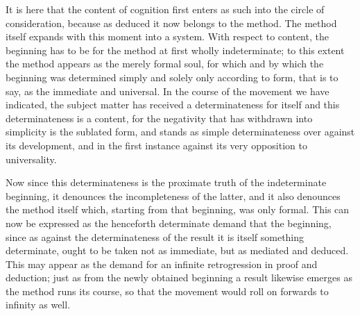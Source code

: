 It is here that the content of cognition first enters
as such into the circle of consideration,
because as deduced it now belongs to the method.
The method itself expands with this moment into a system.
With respect to content, the beginning has to be
for the method at first wholly indeterminate;
to this extent the method appears as the merely formal soul,
for which and by which the beginning was determined
simply and solely only according to form,
that is to say, as the immediate and universal.
In the course of the movement we have indicated,
the subject matter has received a determinateness for itself
and this determinateness is a content,
for the negativity that has withdrawn
into simplicity is the sublated form,
and stands as simple determinateness over against its development,
and in the first instance against its very opposition to universality.

Now since this determinateness is the
proximate truth of the indeterminate beginning,
it denounces the incompleteness of the latter,
and it also denounces the method itself
which, starting from that beginning, was only formal.
This can now be expressed as the henceforth
determinate demand that the beginning,
since as against the determinateness of the result
it is itself something determinate,
ought to be taken not as immediate,
but as mediated and deduced.
This may appear as the demand for
an infinite retrogression in proof and deduction;
just as from the newly obtained beginning a result
likewise emerges as the method runs its course,
so that the movement would roll on forwards to infinity as well.

